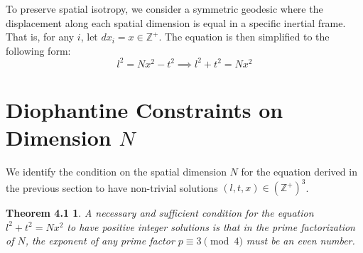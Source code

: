 \documentclass[11pt,a4paper]{article}
\begin{document}
To preserve spatial isotropy, we consider a symmetric geodesic where the displacement along each spatial dimension is equal in a specific inertial frame. That is, for any \( i \), let \( dx_i = x \in \mathbb{Z}^+ \). The equation is then simplified to the following form:
\[ l^2 = N x^2 - t^2 \implies l^2 + t^2 = N x^2 \]

\section{Diophantine Constraints on Dimension \( N \)}
We identify the condition on the spatial dimension \( N \) for the equation derived in the previous section to have non-trivial solutions \( (l, t, x) \in (\mathbb{Z}^+)^3 \).

\newtheorem*{theorem}{Theorem 4.1}
\begin{theorem}
A necessary and sufficient condition for the equation \( l^2 + t^2 = N x^2 \) to have positive integer solutions is that in the prime factorization of \( N \), the exponent of any prime factor \( p \equiv 3 \pmod 4 \) must be an even number.
\end{theorem}
\end{document}
